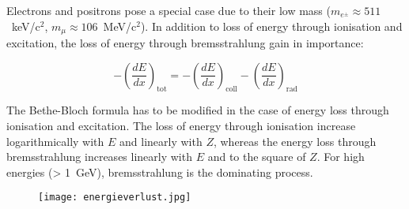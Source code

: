 Electrons and positrons pose a special case due to their low mass ($m_{e^{\pm}} \approx
511$~keV/c$^2$, $m_{\mu} \approx 106$~MeV/c$^2$). In addition to loss of energy through ionisation
and excitation, the loss of energy through bremsstrahlung gain in importance:

\[-\left(\frac{dE}{dx}\right)_{\text{tot}} = -\left(\frac{dE}{dx}\right)_{\text{coll}}
-\left(\frac{dE}{dx}\right)_{\text{rad}} \]

The Bethe-Bloch formula has to be modified in the case of energy loss through ionisation and
excitation. The loss of energy through ionisation increase logarithmically with $E$ and linearly
with $Z$, whereas the energy loss through bremsstrahlung increases linearly with $E$ and to the
square of $Z$. For high energies (> 1~GeV), bremsstrahlung is the dominating process. 

\begin{figure}[H]
	\centering
	\texttt{[image: energieverlust.jpg]}
	\caption{}
	\label{}
\end{figure}
